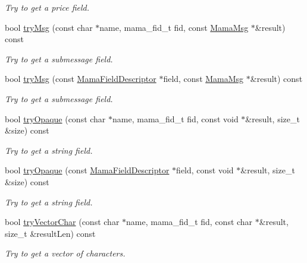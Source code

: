 \begin{DoxyCompactItemize}
\begin{DoxyCompactList}\small\item\em Try to get a price field. \item\end{DoxyCompactList}\item 
bool \hyperlink{classWombat_1_1MamaMsg_a857c57465eb999e8e6da21fa9b430880}{tryMsg} (const char $\ast$name, mama\_\-fid\_\-t fid, const \hyperlink{classWombat_1_1MamaMsg}{MamaMsg} $\ast$\&result) const 
\begin{DoxyCompactList}\small\item\em Try to get a submessage field. \item\end{DoxyCompactList}\item 
bool \hyperlink{classWombat_1_1MamaMsg_a7fa5e237b99e21852ccfe1d2a35d66db}{tryMsg} (const \hyperlink{classWombat_1_1MamaFieldDescriptor}{MamaFieldDescriptor} $\ast$field, const \hyperlink{classWombat_1_1MamaMsg}{MamaMsg} $\ast$\&result) const 
\begin{DoxyCompactList}\small\item\em Try to get a submessage field. \item\end{DoxyCompactList}\item 
bool \hyperlink{classWombat_1_1MamaMsg_a90ce9c7851b9086fef620168759d2368}{tryOpaque} (const char $\ast$name, mama\_\-fid\_\-t fid, const void $\ast$\&result, size\_\-t \&size) const 
\begin{DoxyCompactList}\small\item\em Try to get a string field. \item\end{DoxyCompactList}\item 
bool \hyperlink{classWombat_1_1MamaMsg_a968df33a21a943014ea264edbb90520a}{tryOpaque} (const \hyperlink{classWombat_1_1MamaFieldDescriptor}{MamaFieldDescriptor} $\ast$field, const void $\ast$\&result, size\_\-t \&size) const 
\begin{DoxyCompactList}\small\item\em Try to get a string field. \item\end{DoxyCompactList}\item 
bool \hyperlink{classWombat_1_1MamaMsg_aa4dab0b345136998178c87c2f073d3ff}{tryVectorChar} (const char $\ast$name, mama\_\-fid\_\-t fid, const char $\ast$\&result, size\_\-t \&resultLen) const 
\begin{DoxyCompactList}\small\item\em Try to get a vector of characters. \item\end{DoxyCompactList}\item 

\end{DoxyCompactItemize}
